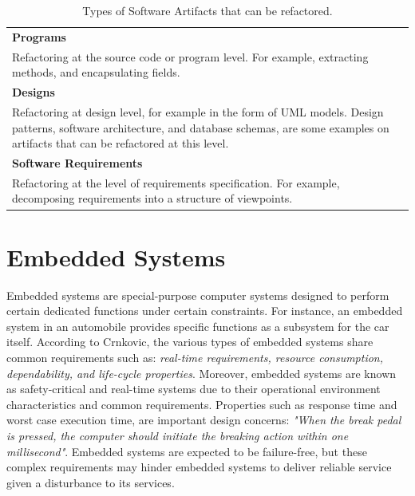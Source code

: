 {\begin{table}[ht!]
	\renewcommand{\arraystretch}{1.2}
	\centering	
	\begin{tabular}{p{}} \hline
		\textbf{Programs} \\Refactoring at the source code or program level. For example, extracting methods, and encapsulating fields. \\ \hline
		\textbf{Designs} \\
		Refactoring at design level, for example in the form of UML models. Design patterns, software architecture, and database schemas, are some examples on artifacts that can be refactored at this level. \\ \hline
		\textbf{Software Requirements} \\
		Refactoring at the level of requirements specification. For example, decomposing requirements into a structure of viewpoints. \\ \hline
	\end{tabular}
	\caption{Types of Software Artifacts that can be refactored.}
	\label{tab:refactorArtifacts}
\end{table}





			

\section{Embedded Systems}
\label{sec:2-ES}
Embedded systems are special-purpose computer systems designed to perform certain dedicated functions under certain constraints. For instance, an embedded system in an automobile provides specific functions as a subsystem for the car itself\cite{Crnkovic:2005:CSE:1062455.1062631}. According to Crnkovic\cite{crnkovic2004component}, the various types of embedded systems share common requirements such as: \textit{real-time requirements, resource consumption, dependability, and life-cycle properties}. Moreover, embedded systems are known as safety-critical and real-time systems due to their operational environment characteristics and common requirements\cite{563572,Crnkovic:2005:CSE:1062455.1062631}. Properties such as response time and worst case execution time, are important design concerns\cite{4519555}: \textit{"When the break pedal is pressed, the computer should initiate the breaking action within one millisecond"}. Embedded systems are expected to be failure-free\cite{you2013reliability}, but these complex requirements may hinder embedded systems to deliver reliable service given a disturbance to its services\cite{patil2009embedded}. 

}
